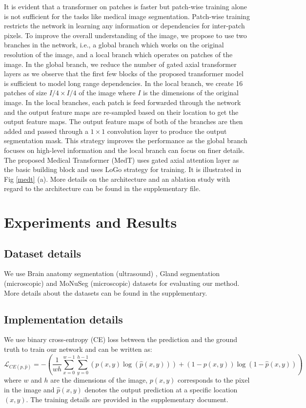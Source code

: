 \documentclass[runningheads]{llncs}
\begin{document}
	It is evident that a transformer on patches is faster but patch-wise training alone is not sufficient for the tasks like medical image segmentation. Patch-wise training restricts the network in learning any information or dependencies for inter-patch pixels. To improve the overall understanding of the image, we propose to use two branches in the network, i.e., a global branch which works on the original resolution of the image, and a local branch which operates on patches of the image.	In the global branch, we reduce the number of gated axial transformer layers as we observe that the first few blocks of the proposed transformer model is sufficient to model long range dependencies. In the local branch, we create 16 patches of size $I/4 \times I/4$ of the image where $I$ is the dimensions of the original image. In the local branches, each patch is feed forwarded through the network and the output feature maps are re-sampled based on their  location to get the output feature maps. The output feature maps of both of the branches are then added and passed through a $1 \times 1$ convolution layer to produce the output segmentation mask. This strategy improves the performance as the global branch focuses on high-level information and the local branch can focus on finer details. The proposed Medical Transformer (MedT) uses gated axial attention layer as the basic building block and uses LoGo strategy for training. It is illustrated in Fig \ref{medt} (a). More details on the architecture and an ablation study with regard to the architecture can be found in the supplementary file.
	
	\section{Experiments and Results}
	
	\subsection{Dataset details}
	
	We use Brain anatomy segmentation (ultrasound) \cite{wang2018automatic,valanarasu2020learning}, Gland segmentation (microscopic) \cite{sirinukunwattana2017gland} and MoNuSeg (microscopic) \cite{kumar2019multi,kumar2017dataset} datasets for evaluating our method. More details about the datasets can be found in the supplementary.
	


	\subsection{Implementation details}
	We use binary cross-entropy (CE) loss between the prediction and the ground truth to train our network and can be written as:	
	\[\mathcal{L}_{CE(p,\hat{p})} = - \left(\frac{1}{wh} \sum_{x=0}^{w-1}\sum_{y=0}^{h-1}(p(x,y) \log(\hat{p}(x,y)) ) + (1-p(x,y))\log(1-\hat{p}(x,y))\right)\]	
	where $w$ and $h$ are the dimensions of the image,  $p(x,y)$ corresponds to the pixel in the image and  $\hat{p}(x,y)$ denotes the output prediction at a specific location $(x,y)$. The training details are provided in the supplementary document.
\end{document}
